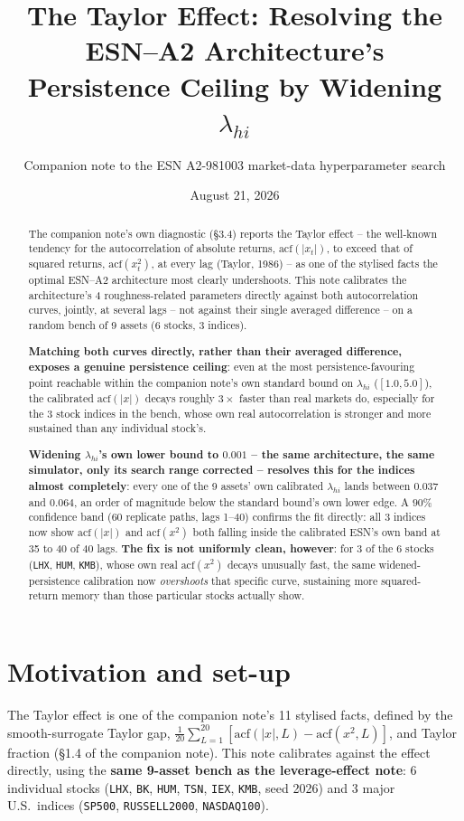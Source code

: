 \documentclass[11pt]{article}
\title{The Taylor Effect: Resolving the ESN--A2 Architecture's\\
Persistence Ceiling by Widening $\lambda_{hi}$}
\author{Companion note to the ESN A2-981003 market-data hyperparameter search}
\date{August 21, 2026}
\begin{document}
\maketitle

\begin{abstract}
The companion note's own diagnostic (\S3.4) reports the Taylor effect -- the
well-known tendency for the autocorrelation of absolute returns,
$\text{acf}(|x_t|)$, to exceed that of squared returns, $\text{acf}(x_t^2)$, at
every lag (Taylor, 1986) -- as one of the stylised facts the optimal ESN--A2
architecture most clearly undershoots. This note calibrates the architecture's
4 roughness-related parameters directly against both autocorrelation curves,
jointly, at several lags -- not against their single averaged difference --
on a random bench of 9 assets (6 stocks, 3 indices).

\textbf{Matching both curves directly, rather than their averaged difference,
exposes a genuine persistence ceiling}: even at the most persistence-favouring
point reachable within the companion note's own standard bound on
$\lambda_{hi}$ ($[1.0,5.0]$), the calibrated $\text{acf}(|x|)$ decays roughly
$3\times$ faster than real markets do, especially for the 3 stock indices in
the bench, whose own real autocorrelation is stronger and more sustained than
any individual stock's.

\textbf{Widening $\lambda_{hi}$'s own lower bound to $0.001$ -- the same
architecture, the same simulator, only its search range corrected -- resolves
this for the indices almost completely}: every one of the 9 assets' own
calibrated $\lambda_{hi}$ lands between $0.037$ and $0.064$, an order of
magnitude below the standard bound's own lower edge. A $90\%$ confidence band
(60 replicate paths, lags 1--40) confirms the fit directly: all 3 indices now
show $\text{acf}(|x|)$ and $\text{acf}(x^2)$ both falling inside the
calibrated ESN's own band at 35 to 40 of 40 lags. \textbf{The fix is not
uniformly clean, however}: for 3 of the 6 stocks (\texttt{LHX}, \texttt{HUM},
\texttt{KMB}), whose own real $\text{acf}(x^2)$ decays unusually fast, the
same widened-persistence calibration now \emph{overshoots} that specific
curve, sustaining more squared-return memory than those particular stocks
actually show.
\end{abstract}

\tableofcontents

\section{Motivation and set-up}
The Taylor effect is one of the companion note's 11 stylised facts, defined by
the smooth-surrogate Taylor gap, $\frac{1}{20}\sum_{L=1}^{20}
[\text{acf}(|x|,L)-\text{acf}(x^2,L)]$, and Taylor fraction (\S1.4 of the
companion note). This note calibrates against the effect directly, using the
\textbf{same 9-asset bench as the leverage-effect note}: 6 individual stocks
(\texttt{LHX}, \texttt{BK}, \texttt{HUM}, \texttt{TSN}, \texttt{IEX},
\texttt{KMB}, seed 2026) and 3 major U.S.\ indices (\texttt{SP500},
\texttt{RUSSELL2000}, \texttt{NASDAQ100}).
\end{document}
